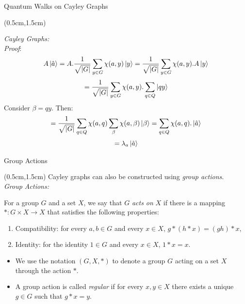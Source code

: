 \documentclass{beamer}
\theoremstyle{definition}
\begin{document}
\begin{frame}{Quantum Walks on Cayley Graphs}
    
    \begin{textblock*}{12cm}(0.5cm,1.5cm)
        
        \textit{Cayley Graphs:} \\
        \vspace{0.3cm}
        \textit{Proof}:
        \[
        A\ket{\hat{a}} = A.\frac{1}{\sqrt{|G|}}\sum_{y \in G}\chi(a,y)\ket{y} = \frac{1}{\sqrt{|G|}}\sum_{y \in G}\chi(a,y).A\ket{y}
        \]
        \[
        = \frac{1}{\sqrt{|G|}}\sum_{y \in G}\chi(a,y).\sum_{q \in Q}\ket{qy}
        \]
        Consider $\beta = qy$. Then:
        \[
         = \frac{1}{\sqrt{|G|}}\sum_{q \in Q}\chi(a,q)\sum_{\beta}\chi(a,\beta)\ket{\beta} = \sum_{q \in Q}\chi(a,q) . \ket{\hat{a}}
        \]
        \[
         = \lambda_a\ket{\hat{a}}
        \]
    \end{textblock*}
\end{frame}




\begin{frame}{Group Actions}
    
    \begin{textblock*}{12cm}(0.5cm,1.5cm)
        Cayley graphs can also be constructed using \textit{group actions}.\\
        \vspace{0.5cm}
        \textit{Group Actions:}
        \vspace{0.5cm}
                
        For a group $G$ and a set $X$, we say that $G$ \textit{acts on} $X$ if there is a mapping $*: G \times X \to X$ that satisfies the following properties:
        \begin{enumerate}
            \item Compatibility: for every $a, b \in G$ and every $x \in X$, $g * (h * x) = (gh) * x$,
            \item Identity: for the identity $1 \in G$ and every $x \in X$, $1 * x = x$. 
        \end{enumerate}

        \vspace{0.5 cm}
        \begin{itemize}
            \item  We use the notation $(G, X, *)$ to denote a group $G$ acting on a set $X$ through the action $*$.
            \item  A group action is called \textit{regular} if for every $x, y \in X$ there exists a unique $g \in G$ such that $g * x = y$.
        \end{itemize}


    \end{textblock*}

\end{frame}
\end{document}

